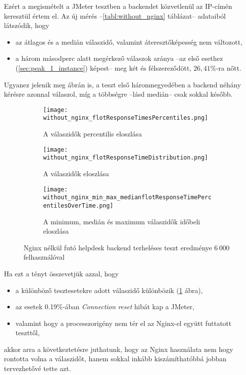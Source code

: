Ezért a megismételt a JMeter tesztben a backendet közvetlenül az IP-címén keresztül értem el. Az új mérés --\ref{tabl:without_nginx} táblázat-- adataiból látszódik, hogy

\begin{itemize}
	\item az átlagos és a medián válaszidő, valamint áteresztőképesség nem változott,
	\item a három másodperc alatt megérkező válaszok aránya --az első esethez (\ref{sec:peak_1_instance}) képest-- meg két és félszereződött, $26,41\%$-ra nőtt.
\end{itemize}



Ugyanez jelenik meg  ábrán is, a teszt első háromnegyedében a backend néhány kérésre azonnal válaszol, míg a többségre --lásd medián-- csak sokkal később.

\begin{figure}[hbt]
	\begin{subfigure}{.49\textwidth}
		\centering
		\texttt{[image: without\_nginx\_flotResponseTimesPercentiles.png]}  
		\caption{A válaszidők percentilis eloszlása}
		\label{fig:without_nginx_percentil}
	\end{subfigure}
	\begin{subfigure}{.49\textwidth}
		\centering
		\texttt{[image: without\_nginx\_flotResponseTimeDistribution.png]}  
		\caption{A válaszidők eloszlása}
	\end{subfigure}
	
	\quad
	
	\begin{subfigure}{.95\textwidth}
		\centering
		\texttt{[image: without\_nginx\_min\_max\_medianflotResponseTimePercentilesOverTime.png]}  
		\caption{A minimum, medián és maximum válaszidők időbeli eloszlása}
		\label{fig:without_nginx_min_median_max_over_time}
	\end{subfigure}
	
	\caption[Helpdesk backend terheléses teszt Nginx nélkül]{Nginx nélkül futó helpdesk backend terheléses teszt eredménye $6~000$ felhasználóval}
\end{figure}


Ha ezt a tényt összevetjük azzal, hogy
\begin{itemize}
	\item a különböző tesztesetekre adott válaszidő különbözik (\ref{fig:without_nginx_percentil} ábra),
	\item az esetek 0.19\%-ában \textit{Connection reset} hibát kap a JMeter,
	\item valamint hogy a processzorigény nem tér el az Nginx-el együtt futtatott teszttől,
\end{itemize}
akkor arra a következtetésre juthatunk, hogy az Nginx használata nem hogy rontotta volna a válaszidőt, hanem sokkal inkább kiszámíthatóbbá jobban tervezhetővé tette azt.


